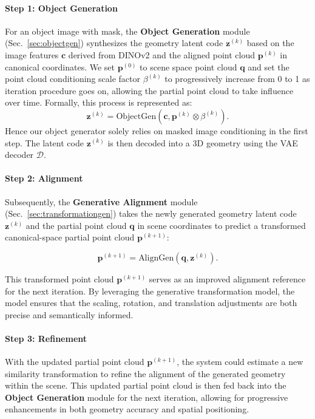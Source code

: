 \noindent\paragraph{Step 1: Object Generation}
%
For an object image with mask, the \textbf{Object Generation} module (Sec.~\ref{sec:objectgen}) synthesizes the geometry latent code \(\bm{z}^{(k)}\) based on the image features \(\bm{c}\) derived from DINOv2 and the aligned point cloud \(\bm{p}^{(k)}\) in canonical coordinates. We set $\bm{p}^{(0)}$ to scene space point cloud $\bm{q}$ and set the point cloud conditioning scale factor \(\beta^{(k)}\) to progressively increase from 0 to 1 as iteration procedure goes on, allowing the partial point cloud to take influence over time. Formally, this process is represented as:
\begin{equation}
    \bm{z}^{(k)} = \text{ObjectGen}(\bm{c}, \bm{p}^{(k)} \otimes \beta^{(k)}).
\end{equation}
Hence our object generator solely relies on masked image conditioning in the first step. The latent code \(\bm{z}^{(k)}\) is then decoded into a 3D geometry using the VAE decoder \(\mathcal{D}\).

\noindent \paragraph{Step 2: Alignment}
%
Subsequently, the \textbf{Generative Alignment} module (Sec.~\ref{sec:transformationgen}) takes the newly generated geometry latent code \(\bm{z}^{(k)}\) and the partial point cloud \(\bm{q}\) in scene coordinates to predict a transformed canonical-space partial point cloud \(\bm{p}^{(k+1)}\):

\begin{equation}
\bm{p}^{(k+1)} = \text{AlignGen}(\bm{q}, \bm{z}^{(k)}).
\end{equation}

This transformed point cloud \(\bm{p}^{(k+1)}\) serves as an improved alignment reference for the next iteration. By leveraging the generative transformation model, the model ensures that the scaling, rotation, and translation adjustments are both precise and semantically informed.%

\noindent \paragraph{Step 3: Refinement}
%
With the updated partial point cloud \(\bm{p}^{(k+1)}\), the system could estimate a new similarity transformation to refine the alignment of the generated geometry within the scene. This updated partial point cloud is then fed back into the \textbf{Object Generation} module for the next iteration, allowing for progressive enhancements in both geometry accuracy and spatial positioning.


